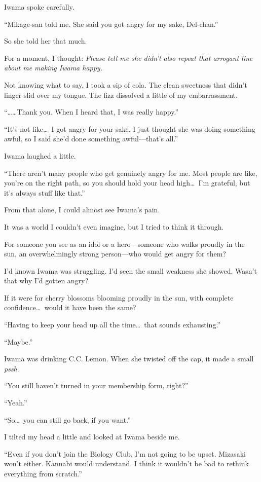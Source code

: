 \documentclass[
    a4paper,
    12pt,
    twoside,
    openany,
    UTF8,
    fontset=windows
]{ctexbook}
\begin{document}
Iwama spoke carefully.

``Mikage-san told me. She said you got angry for my sake, Del-chan.''

So she told her that much.

For a moment, I thought: \textit{Please tell me she didn't also repeat that arrogant line about me making Iwama happy.}

Not knowing what to say, I took a sip of cola. The clean sweetness that didn't linger slid over my tongue. The fizz dissolved a little of my embarrassment.

``\dots\dots Thank you. When I heard that, I was really happy.''

``It's not like\dots\ I got angry for your sake. I just thought she was doing something awful, so I said she'd done something awful---that's all.''

Iwama laughed a little.

``There aren't many people who get genuinely angry for me. Most people are like, you're on the right path, so you should hold your head high\dots\ I'm grateful, but it's always stuff like that.''

From that alone, I could almost see Iwama's pain.

It was a world I couldn't even imagine, but I tried to think it through.

For someone you see as an idol or a hero---someone who walks proudly in the sun, an overwhelmingly strong person---who would get angry for them?

I'd known Iwama was struggling. I'd seen the small weakness she showed. Wasn't that why I'd gotten angry?

If it were for cherry blossoms blooming proudly in the sun, with complete confidence\dots\ would it have been the same?

``Having to keep your head up all the time\dots\ that sounds exhausting.''

``Maybe.''

Iwama was drinking C.C. Lemon. When she twisted off the cap, it made a small \textit{pssh}.

``You still haven't turned in your membership form, right?''

``Yeah.''

``So\dots\ you can still go back, if you want.''

I tilted my head a little and looked at Iwama beside me.

``Even if you don't join the Biology Club, I'm not going to be upset. Mizasaki won't either. Kannabi would understand. I think it wouldn't be bad to rethink everything from scratch.''
\end{document}
